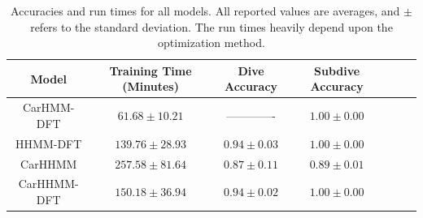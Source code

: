 

\begin{table}[h]
\centering
\caption{Accuracies and run times for all models. All reported values are averages, and $\pm$ refers to the standard deviation. The run times heavily depend upon the optimization method.}
\begin{tabular}{ccccccc}
Model       & \multicolumn{1}{c}{Training Time (Minutes)} & \multicolumn{1}{c}{Dive Accuracy} & \multicolumn{1}{c}{Subdive Accuracy}  \\ \hline
CarHMM-DFT  & $61.68 \pm 10.21$                            & -------------                     & $1.00 \pm 0.00$                       \\ 
HHMM-DFT    & $139.76 \pm 28.93$                           & $0.94 \pm 0.03$                   & $1.00 \pm 0.00$                       \\
CarHHMM     & $257.58 \pm 81.64$                           & $0.87 \pm 0.11$                   & $0.89 \pm 0.01$                       \\
CarHHMM-DFT & $150.18 \pm 36.94$                           & $0.94 \pm 0.02$                   & $1.00 \pm 0.00$                       \\
\end{tabular}
\label{table:accuracy}
\end{table}

